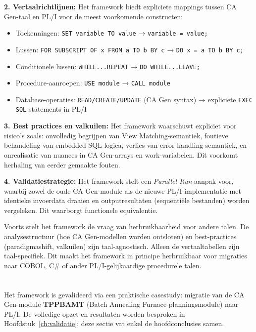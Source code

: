 \textbf{2. Vertaalrichtlijnen:} Het framework biedt expliciete mappings tussen CA Gen-taal en PL/I voor de meest voorkomende constructen:
\begin{itemize}
    \item Toekenningen: \texttt{SET variable TO value} → \texttt{variable = value;}
    \item Lussen: \texttt{FOR SUBSCRIPT OF x FROM a TO b BY c} → \texttt{DO x = a TO b BY c;}
    \item Conditionele lussen: \texttt{WHILE...REPEAT} → \texttt{DO WHILE...LEAVE;}
    \item Procedure-aanroepen: \texttt{USE module} → \texttt{CALL module}
    \item Database-operaties: \texttt{READ/CREATE/UPDATE} (CA Gen syntax) → expliciete \texttt{EXEC SQL} statements in PL/I
\end{itemize}

\textbf{3. Best practices en valkuilen:} Het framework waarschuwt expliciet voor risico's zoals: 
onvolledig begrijpen van View Matching-semantiek, foutieve behandeling van embedded SQL-logica, verlies van 
error-handling semantiek, en onrealisatie van nuances in CA Gen-arrays en work-variabelen. 
Dit voorkomt herhaling van eerder gemaakte fouten.

\textbf{4. Validatiestrategie:} Het framework stelt een \textit{Parallel Run} aanpak voor, 
waarbij zowel de oude CA Gen-module als de nieuwe PL/I-implementatie met identieke invoerdata draaien en 
outputresultaten (sequentiële bestanden) worden vergeleken. 
Dit waarborgt functionele equivalentie.

Voorts stelt het framework de vraag van herbruikbaarheid voor andere talen. De analysestructuur 
(hoe CA Gen-modellen worden ontsloten) en best-practices (paradigmashift, valkuilen) zijn taal-agnostisch. 
Alleen de vertaaltabellen zijn taal-specifiek. Dit maakt het framework in principe herbruikbaar voor migraties naar 
COBOL, C\# of ander PL/I-gelijkaardige procedurele talen.

\section{}%
\label{sec:poc-validatie}

Het framework is gevalideerd via een praktische casestudy: migratie van de CA Gen-module \textbf{TPPBAMT} 
(Batch Annealing Furnace-planningsmodule) naar PL/I. De volledige opzet en resultaten worden besproken in
Hoofdstuk~\ref{ch:validatie}; deze sectie vat enkel de hoofdconclusies samen.

